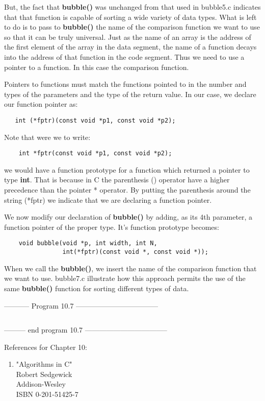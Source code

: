 But, the fact that \textbf{bubble()} was unchanged from that used in
bubble5.c indicates that that function is capable of sorting a wide
variety of data types. What is left to do is to pass to
\textbf{bubble()} the name of the comparison function we want to use so
that it can be truly universal. Just as the name of an array is the
address of the first element of the array in the data segment, the name
of a function decays into the address of that function in the code
segment. Thus we need to use a pointer to a function. In this case the
comparison function.

Pointers to functions must match the functions pointed to in the number
and types of the parameters and the type of the return value. In our
case, we declare our function pointer as:

\begin{verbatim}
   int (*fptr)(const void *p1, const void *p2);
\end{verbatim}

Note that were we to write:

\begin{verbatim}
    int *fptr(const void *p1, const void *p2);
\end{verbatim}

we would have a function prototype for a function which returned a
pointer to type \textbf{int}. That is because in C the parenthesis ()
operator have a higher precedence than the pointer * operator. By
putting the parenthesis around the string (*fptr) we indicate that we
are declaring a function pointer.

We now modify our declaration of \textbf{bubble()} by adding, as its 4th
parameter, a function pointer of the proper type. It's function
prototype becomes:

\begin{verbatim}
    void bubble(void *p, int width, int N,
                int(*fptr)(const void *, const void *));
\end{verbatim}

When we call the \textbf{bubble()}, we insert the name of the comparison
function that we want to use. bubble7.c illustrate how this approach
permits the use of the same \textbf{bubble()} function for sorting
different types of data.

-----------  Program 10.7  -----------------------------------
\inputminted[breaklines]{c}{../src/ch10-7.c}
--------- end program 10.7 -----------------------------------

References for Chapter 10:

\begin{enumerate}
\tightlist
\item
  "Algorithms in C"\\
  Robert Sedgewick\\
  Addison-Wesley\\
  ISBN 0-201-51425-7\\
\end{enumerate}

\begin{comment}
\href{epilogx.htm}{Epilog}

\href{pointers.htm}{Back to Table of Contents}
\end{comment}
